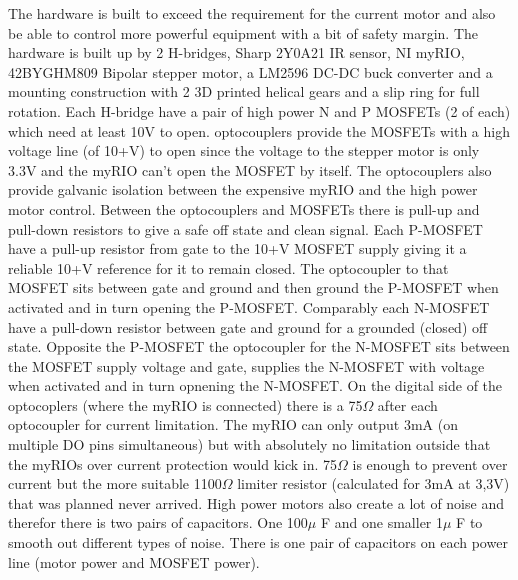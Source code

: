 The hardware is built to exceed the requirement for the current motor and also be able to control more powerful equipment with a bit of safety margin. \newline
The hardware is built up by 2 H-bridges, Sharp 2Y0A21 IR sensor, NI myRIO, 42BYGHM809 Bipolar stepper motor, a LM2596 DC-DC buck converter and a mounting construction with 2 3D printed helical gears and a slip ring for full rotation. 
Each H-bridge have a pair of high power N and P MOSFETs (2 of each) which need at least 10V to open. optocouplers provide the MOSFETs with a high voltage line (of 10+V) to open since the voltage to the stepper motor is only 3.3V and the myRIO can't open the MOSFET by itself. The optocouplers also provide galvanic isolation between the expensive myRIO and the high power motor control. 
Between the optocouplers and MOSFETs there is pull-up and pull-down resistors to give a safe off state and clean signal.\newline
Each P-MOSFET have a pull-up resistor from gate to the 10+V MOSFET supply giving it a reliable 10+V reference for it to remain closed. The optocoupler to that MOSFET sits between gate and ground and then ground the P-MOSFET when activated and in turn opening the P-MOSFET.\newline
Comparably each N-MOSFET have a pull-down resistor between gate and ground for a grounded (closed) off state. Opposite the P-MOSFET the optocoupler for the N-MOSFET sits between the MOSFET supply voltage and gate, supplies the N-MOSFET with voltage when activated and in turn opnening the N-MOSFET.\newline
On the digital side of the optocoplers (where the myRIO is connected) there is a 75$\Omega$ after each optocoupler for current limitation. The myRIO can only output 3mA (on multiple DO pins simultaneous) but with absolutely no limitation outside that the myRIOs over current protection would kick in. 75$\Omega$ is enough to prevent over current but the more suitable 1100$\Omega$ limiter resistor (calculated for 3mA at 3,3V) that was planned never arrived.\newline
High power motors also create a lot of noise and therefor there is two pairs of capacitors. One 100$\mu$ F and one smaller 1$\mu$ F to smooth out different types of noise. There is one pair of capacitors on each power line (motor power and MOSFET power).